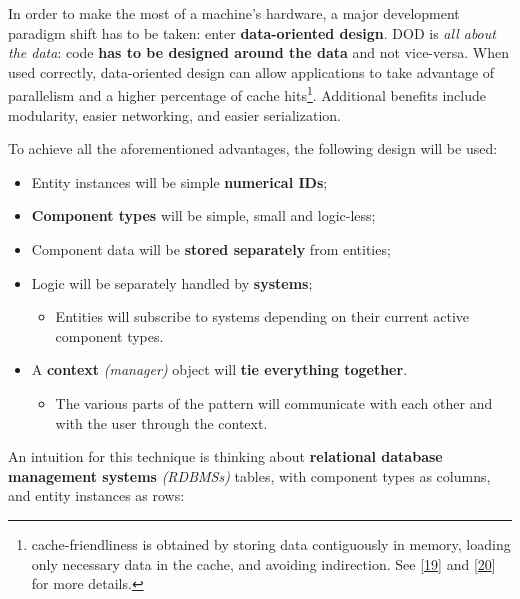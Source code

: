 \documentclass[oneside, 12pt, a4paper, openany]{book}
\providecommand{\tightlist}{%
  \setlength{\itemsep}{0pt}\setlength{\parskip}{0pt}}
\begin{document}
In order to make the most of a machine's hardware, a major development
paradigm shift has to be taken: enter \textbf{data-oriented design}. DOD
is \emph{all about the data}: code \textbf{has to be designed around the
data} and not vice-versa. When used correctly, data-oriented design can
allow applications to take advantage of parallelism and a higher
percentage of cache hits\footnote{cache-friendliness is obtained by
  storing data contiguously in memory, loading only necessary data in
  the cache, and avoiding indirection. See
  {[}\protect\hyperlink{ref-ithare_allocations}{19}{]} and
  {[}\protect\hyperlink{ref-scee_oop_pitfalls}{20}{]} for more details.}.
Additional benefits include modularity, easier networking, and easier
serialization.

To achieve all the aforementioned advantages, the following design will
be used:

\begin{itemize}
\item
  Entity instances will be simple \textbf{numerical IDs};
\item
  \textbf{Component types} will be simple, small and logic-less;
\item
  Component data will be \textbf{stored separately} from entities;
\item
  Logic will be separately handled by \textbf{systems};

  \begin{itemize}
  \tightlist
  \item
    Entities will subscribe to systems depending on their current active
    component types.
  \end{itemize}
\item
  A \textbf{context} \emph{(manager)} object will \textbf{tie everything
  together}.

  \begin{itemize}
  \tightlist
  \item
    The various parts of the pattern will communicate with each other
    and with the user through the context.
  \end{itemize}
\end{itemize}

An intuition for this technique is thinking about \textbf{relational
database management systems} \emph{(RDBMSs)} tables, with component
types as columns, and entity instances as rows:
\end{document}
